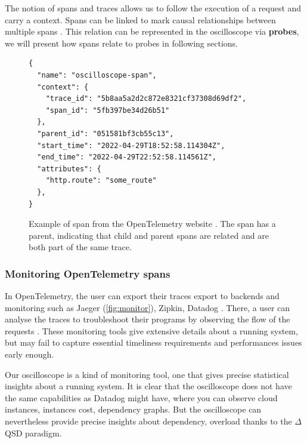     The notion of spans and traces allows us to follow the execution of a request and carry a context. Spans can be linked to mark causal relationships between multiple spans \cite{otel-t}. This relation can be represented in the oscilloscope via \textbf{probes}, we will present how spans relate to probes in following sections.
    \begin{figure}[H]
    \begin{verbatim} 
{
  "name": "oscilloscope-span",
  "context": {
    "trace_id": "5b8aa5a2d2c872e8321cf37308d69df2",
    "span_id": "5fb397be34d26b51"
  },
  "parent_id": "051581bf3cb55c13",
  "start_time": "2022-04-29T18:52:58.114304Z",
  "end_time": "2022-04-29T22:52:58.114561Z",
  "attributes": {
    "http.route": "some_route"
  },
}
    \end{verbatim}
    \caption{Example of span from the OpenTelemetry website \cite{otel-t}. The span has a parent, indicating that child and parent spans are related and are both part of the same trace.}%
    \end{figure}

    \subsubsection{Monitoring OpenTelemetry spans}
        In OpenTelemetry, the user can export their traces export to backends and monitoring such as Jaeger (\cref{fig:monitor}), Zipkin, Datadog \cite{otel-exp}. There, a user can analyse the traces to troubleshoot their programs by observing the flow of the requests \cite{jg}. These monitoring tools give extensive details about a running system, but may fail to capture essential timeliness requirements and performances issues early enough.
        
        Our oscilloscope is a kind of monitoring tool, one that gives precise statistical insights about a running system. It is clear that the oscilloscope does not have the same capabilities as Datadog \cite{datadog} might have, where you can observe cloud instances, instances cost, dependency graphs. But the oscilloscope can nevertheless provide precise insights about dependency, overload thanks to the $\Delta$QSD paradigm. 

